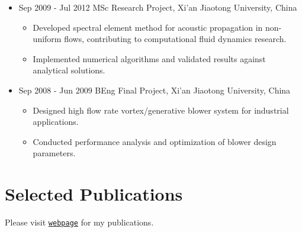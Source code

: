 \documentclass[letterpaper]{article}
\begin{document}
\begin{itemize}
\item Sep 2009 - Jul 2012  \hspace{2pt} MSc Research Project, Xi'an Jiaotong University, China
  \begin{itemize}
  \item Developed spectral element method for acoustic propagation in non-uniform flows, contributing to computational fluid dynamics research.
  \item Implemented numerical algorithms and validated results against analytical solutions.
  \end{itemize}

\item Sep 2008 - Jun 2009  \hspace{2pt} BEng Final Project, Xi'an Jiaotong University, China
  \begin{itemize}
  \item Designed high flow rate vortex/generative blower system for industrial applications.
  \item Conducted performance analysis and optimization of blower design parameters.
  \end{itemize}
		
\end{itemize}

\section*{Selected Publications}
Please visit \href{https://raw.githubusercontent.com/guliyolanda/CV/master/YW-papers.pdf} {\tt webpage} for  my publications. 
\end{document}
